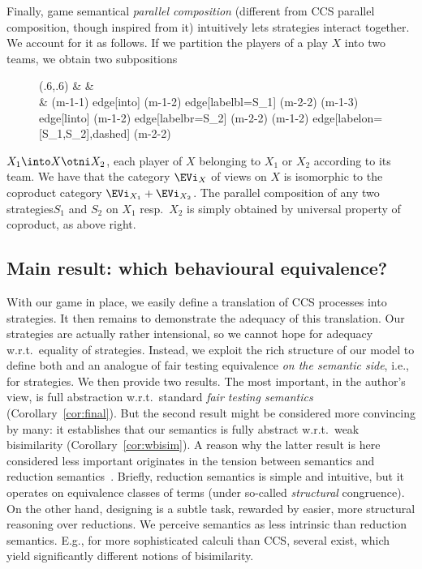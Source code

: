 \documentclass{LMCS}
\theoremstyle{plain}\newtheorem{satz}[thm]{Satz}
\renewcommand{\stratlocales}{strategies\xspace}
\renewcommand{\views}{\EVi}
\begin{document}
Finally, game semantical \emph{parallel composition} (different from
CCS parallel composition, though inspired from it) intuitively
lets strategies interact together.  We account for it as follows.  If
we partition the players of a play $X$ into two teams, 
we obtain  two subpositions 
\begin{wrapfigure}[4]{r}{0pt}
  \begin{minipage}[c][3em]{0.4\linewidth}
\diag(.6,.6){\op{(\views_{X_1})} \&     \op{(\views_{X})} \&     \op{(\views_{X_2})} \\
    \& \set }{(m-1-1) edge[into] (m-1-2) edge[labelbl={S_1}] (m-2-2) (m-1-3) edge[linto] (m-1-2) edge[labelbr={S_2}] (m-2-2) (m-1-2) edge[labelon={[S_1,S_2]},dashed] (m-2-2) }
\end{minipage}\end{wrapfigure}
\noindent $X_1 \into X
\otni X_2$,  each  player of $X$ belonging to $X_1$ or $X_2$ according
to its team. We have that the category $\views_X$ of views on $X$
is isomorphic to the coproduct category $\views_{X_1} +
\views_{X_2}$. The parallel composition of any two \stratlocales $S_1$
and $S_2$ on $X_1$ resp.\ $X_2$ is simply obtained by universal
property of coproduct, as above right.

\subsection{Main result: which behavioural equivalence?}
With our game in place, we easily define a translation of CCS
processes into \stratlocales. It then remains to demonstrate the
adequacy of this translation.  Our \stratlocales are actually rather
intensional, so we cannot hope for adequacy w.r.t.\ equality of
\stratlocales.  Instead, we exploit the rich structure of our model to
define both \anlts{} and an analogue of fair testing equivalence
\emph{on the semantic side}, i.e., for \stratlocales.  We then provide
two results. The most important, in the author's view, is full
abstraction w.r.t.\ standard \emph{fair testing semantics}
(Corollary~\ref{cor:final}). But the second result might be considered
more convincing by many: it establishes that our semantics is fully
abstract w.r.t.\ weak bisimilarity (Corollary~\ref{cor:wbisim}).
A reason why the latter result is here considered less important
originates in the tension between \lts{} semantics and reduction
semantics~\cite{modularLTS}. Briefly, reduction semantics is simple
and intuitive, but it operates on equivalence classes of terms (under
so-called \emph{structural} congruence). On the other hand, designing
\ltss{} is a subtle task, rewarded by easier, more structural
reasoning over reductions. We perceive \lts{} semantics as less
intrinsic than reduction semantics. E.g., for more sophisticated
calculi than CCS, several \ltss{} exist, which yield significantly
different notions of bisimilarity.
\end{document}
